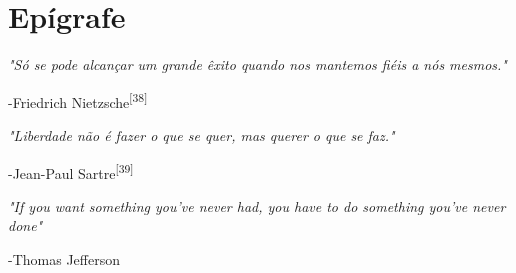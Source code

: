 \chapter*{Epígrafe}

\noindent
\emph{"Só se pode alcançar um grande êxito quando nos mantemos fiéis a nós mesmos."}
	\begin{flushright}
		-Friedrich Nietzsche\textsuperscript{[38]}
	\end{flushright}

\noindent
\emph{"Liberdade não é fazer o que se quer, mas querer o que se faz."}
	\begin{flushright}
		-Jean-Paul Sartre\textsuperscript{[39]}
	\end{flushright}


\noindent
\emph{"If you want something you've never had, you have to do something you've never done"}
	\begin{flushright}
		-Thomas Jefferson
	\end{flushright}
